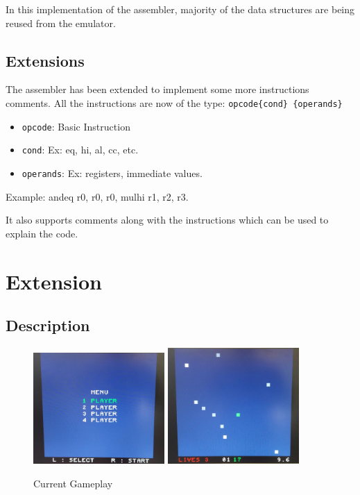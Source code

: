 \documentclass[11pt]{article}
\begin{document}
In this implementation of the assembler, majority of the data structures are
being reused from the emulator.

\newpage

\subsection{Extensions}

The assembler has been extended to implement some more instructions comments.
All the instructions are now of the type:
\texttt{opcode\{cond\} \{operands\}}
\begin{itemize}[noitemsep,topsep=0pt]
  \item \texttt{opcode}: Basic Instruction
  \item \texttt{cond}: Ex: eq, hi, al, cc, etc.
  \item \texttt{operands}: Ex: registers, immediate values.
\end{itemize}
Example: andeq r0, r0, r0, mulhi r1, r2, r3.

It also supports comments along with the instructions which can be used to
explain the code.

\section{Extension}

\subsection{Description}

\begin{figure}
	\caption{Current Gameplay}\label{wrap-fig:1}
	\includegraphics[width=5cm]{menu}
	\includegraphics[width=5cm]{screen}
\end{figure} 
\end{document}
